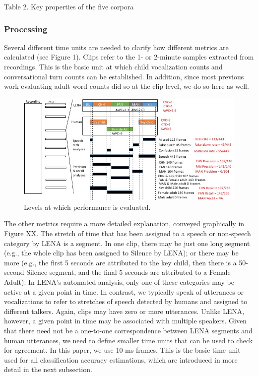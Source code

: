 \documentclass[english,floatsintext,man]{apa6}
\begin{document}
Table 2. Key properties of the five corpora

\subsubsection{Processing}\label{processing}

Several different time units are needed to clarify how different metrics
are calculated (see Figure 1). Clips refer to the 1- or 2-minute samples
extracted from recordings. This is the basic unit at which child
vocalization counts and conversational turn counts can be established.
In addition, since most previous work evaluating adult word counts did
so at the clip level, we do so here as well.

\begin{figure}
\centering
\includegraphics{fig_levels.jpg}
\caption{Levels at which performance is evaluated.}
\end{figure}

The other metrics require a more detailed explanation, conveyed
graphically in Figure XX. The stretch of time that has been assigned to
a speech or non-speech category by LENA is a segment. In one clip, there
may be just one long segment (e.g., the whole clip has been assigned to
Silence by LENA); or there may be more (e.g., the first 5 seconds are
attributed to the key child, then there is a 50-second Silence segment,
and the final 5 seconds are attributed to a Female Adult). In LENA's
automated analysis, only one of these categories may be active at a
given point in time. In contrast, we typically speak of utterances or
vocalizations to refer to stretches of speech detected by humans and
assigned to different talkers. Again, clips may have zero or more
utterances. Unlike LENA, however, a given point in time may be
associated with multiple speakers. Given that there need not be a
one-to-one correspondence between LENA segments and human utterances, we
need to define smaller time units that can be used to check for
agreement. In this paper, we use 10 ms frames. This is the basic time
unit used for all classification accuracy estimations, which are
introduced in more detail in the next subsection.
\end{document}
